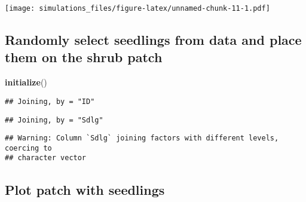 \documentclass[]{article}
\newenvironment{Shaded}{\begin{snugshade}}{\end{snugshade}}
\newcommand{\KeywordTok}[1]{\textcolor[rgb]{0.13,0.29,0.53}{\textbf{#1}}}
\newcommand{\DecValTok}[1]{\textcolor[rgb]{0.00,0.00,0.81}{#1}}
\newcommand{\StringTok}[1]{\textcolor[rgb]{0.31,0.60,0.02}{#1}}
\newcommand{\OperatorTok}[1]{\textcolor[rgb]{0.81,0.36,0.00}{\textbf{#1}}}
\newcommand{\NormalTok}[1]{#1}
\begin{document}
\texttt{[image: simulations\_files/figure-latex/unnamed-chunk-11-1.pdf]}

\subsection{Randomly select seedlings from data and place them on the
shrub
patch}\label{randomly-select-seedlings-from-data-and-place-them-on-the-shrub-patch}

\begin{Shaded}
\begin{Highlighting}[]
\KeywordTok{initialize}\NormalTok{()}
\end{Highlighting}
\end{Shaded}

\begin{verbatim}
## Joining, by = "ID"
\end{verbatim}

\begin{verbatim}
## Joining, by = "Sdlg"
\end{verbatim}

\begin{verbatim}
## Warning: Column `Sdlg` joining factors with different levels, coercing to
## character vector
\end{verbatim}

\subsection{Plot patch with seedlings}\label{plot-patch-with-seedlings}

\begin{Shaded}
\end{Shaded}

\begin{Shaded}
\end{Shaded}
\end{document}
